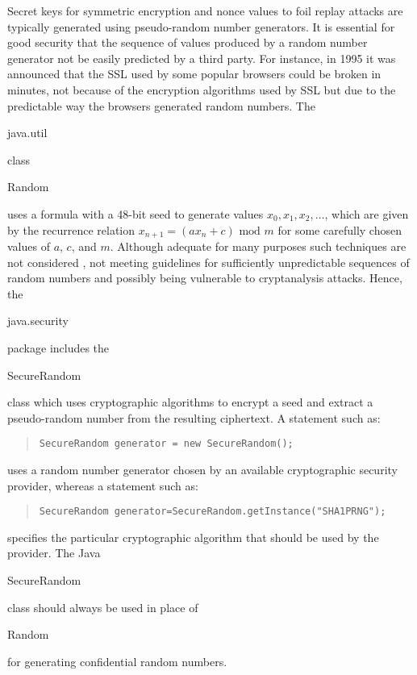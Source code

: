 Secret keys for symmetric encryption and nonce values to foil replay attacks
are typically generated using pseudo-random number generators.
It is essential for good security that the sequence of values produced by a random number
generator not be easily predicted by a third party. For instance, in 1995 it was announced
that the SSL used by some popular browsers could be broken in minutes, not
because of the encryption algorithms used by SSL but due to the predictable
way the browsers generated random numbers.
The \begin{code}java.util\end{code} class \begin{code}Random\end{code}
uses a  formula with a 48-bit seed to
generate values $x_0, x_1, x_2, \dots$, which are given by the
recurrence relation $x_{n+1}=\left(a x_n+c\right)\mbox{ mod }m$ for some
carefully chosen values of $a$, $c$, and $m$.
Although adequate for many purposes such techniques are not considered
, not meeting guidelines for sufficiently unpredictable
sequences of random numbers and possibly being vulnerable to cryptanalysis attacks.
Hence, the \begin{code}java.security\end{code} package includes the
\begin{code}SecureRandom\end{code} class which uses cryptographic
algorithms to encrypt a seed and extract a pseudo-random number from the
resulting ciphertext. A statement such as:
\begin{quote}\begin{code}\begin{verbatim}
SecureRandom generator = new SecureRandom();
\end{verbatim}\end{code}\end{quote}
uses a random number generator chosen by an available cryptographic security provider,
whereas a statement such as:
\begin{quote}\begin{code}\begin{verbatim}
SecureRandom generator=SecureRandom.getInstance("SHA1PRNG");
\end{verbatim}\end{code}\end{quote}
specifies the particular cryptographic algorithm that should be used by the provider.
The Java \begin{code}SecureRandom\end{code} class should always be used in place of
\begin{code}Random\end{code} for generating confidential random numbers.

